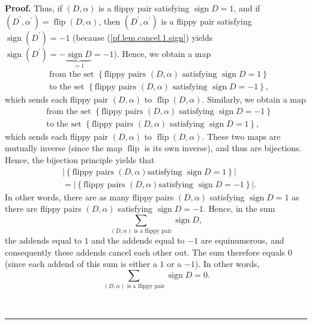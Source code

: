 \documentclass[numbers=enddot,12pt,final,onecolumn,notitlepage]{scrartcl}%
\numberwithin{exer}{subsection}
\theoremstyle{definition}
\newenvironment{proof}[1][Proof]{\noindent\textbf{#1.} }{\ \rule{0.5em}{0.5em}}
\let\sumnonlimits\sum
\renewcommand{\sum}{\sumnonlimits\limits}
\begin{document}
\begin{proof}
Thus, if $\left(  D,\alpha\right)  $ is a flippy pair satisfying
$\operatorname*{sign}D=1$, and if $\left(  D^{\prime},\alpha^{\prime}\right)
=\operatorname*{flip}\left(  D,\alpha\right)  $, then $\left(  D^{\prime
},\alpha^{\prime}\right)  $ is a flippy pair satisfying $\operatorname*{sign}%
\left(  D^{\prime}\right)  =-1$ (because (\ref{pf.lem.cancel.1.sign}) yields
$\operatorname*{sign}\left(  D^{\prime}\right)
=-\underbrace{\operatorname*{sign}D}_{=1}=-1$). Hence, we obtain a map
\begin{align*}
&  \text{from the set }\left\{  \text{flippy pairs }\left(  D,\alpha\right)
\text{ satisfying }\operatorname*{sign}D=1\right\}  \\
&  \text{to the set }\left\{  \text{flippy pairs }\left(  D,\alpha\right)
\text{ satisfying }\operatorname*{sign}D=-1\right\}  ,
\end{align*}
which sends each flippy pair $\left(  D,\alpha\right)  $ to
$\operatorname*{flip}\left(  D,\alpha\right)  $. Similarly, we obtain a map
\begin{align*}
&  \text{from the set }\left\{  \text{flippy pairs }\left(  D,\alpha\right)
\text{ satisfying }\operatorname*{sign}D=-1\right\}  \\
&  \text{to the set }\left\{  \text{flippy pairs }\left(  D,\alpha\right)
\text{ satisfying }\operatorname*{sign}D=1\right\}  ,
\end{align*}
which sends each flippy pair $\left(  D,\alpha\right)  $ to
$\operatorname*{flip}\left(  D,\alpha\right)  $. These two maps are mutually
inverse (since the map $\operatorname*{flip}$ is its own inverse), and thus
are bijections. Hence, the bijection principle yields that%
\begin{align*}
&  \left\vert \left\{  \text{flippy pairs }\left(  D,\alpha\right)  \text{
satisfying }\operatorname*{sign}D=1\right\}  \right\vert \\
&  =\left\vert \left\{  \text{flippy pairs }\left(  D,\alpha\right)  \text{
satisfying }\operatorname*{sign}D=-1\right\}  \right\vert .
\end{align*}
In other words, there are as many flippy pairs $\left(  D,\alpha\right)  $
satisfying $\operatorname*{sign}D=1$ as there are flippy pairs $\left(
D,\alpha\right)  $ satisfying $\operatorname*{sign}D=-1$. Hence, in the sum%
\[
\sum_{\left(  D,\alpha\right)  \text{ is a flippy pair}}\operatorname*{sign}D,
\]
the addends equal to $1$ and the addends equal to $-1$ are equinumerous, and
consequently these addends cancel each other out. The sum therefore equals $0$
(since each addend of this sum is either a $1$ or a $-1$). In other words,%
\begin{equation}
\sum_{\left(  D,\alpha\right)  \text{ is a flippy pair}}\operatorname*{sign}%
D=0.\label{pf.lem.cancel.1.sum-flips}%
\end{equation}



\end{proof}
\end{document}
